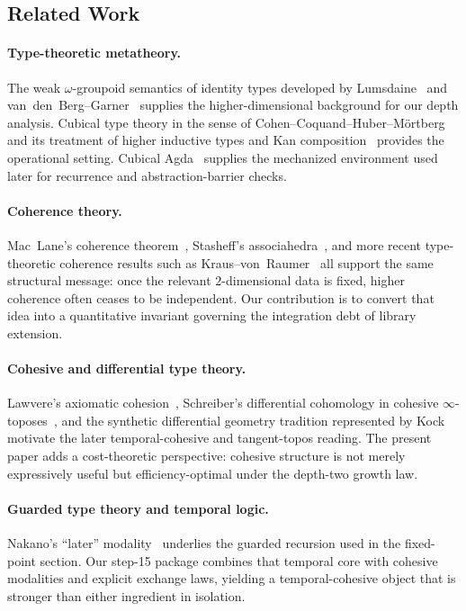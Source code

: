 \documentclass[11pt,a4paper]{article}
\theoremstyle{plain}
\theoremstyle{definition}
\theoremstyle{remark}
\begin{document}
\subsection{Related Work}
\label{sec:related}

\paragraph{Type-theoretic metatheory.}
The weak $\omega$-groupoid semantics of identity types developed by Lumsdaine~\cite{lumsdaine} and van~den~Berg--Garner~\cite{vdberg-garner} supplies the higher-dimensional background for our depth analysis.  Cubical type theory in the sense of Cohen--Coquand--Huber--M\"ortberg~\cite{cubical} and its treatment of higher inductive types and Kan composition~\cite{cchm-hits} provides the operational setting.  Cubical Agda~\cite{cubical-agda} supplies the mechanized environment used later for recurrence and abstraction-barrier checks.

\paragraph{Coherence theory.}
Mac~Lane's coherence theorem~\cite{maclane-coherence}, Stasheff's associahedra~\cite{stasheff}, and more recent type-theoretic coherence results such as Kraus--von~Raumer~\cite{kraus-vonraumer} all support the same structural message: once the relevant $2$-dimensional data is fixed, higher coherence often ceases to be independent.  Our contribution is to convert that idea into a quantitative invariant governing the integration debt of library extension.

\paragraph{Cohesive and differential type theory.}
Lawvere's axiomatic cohesion~\cite{lawvere}, Schreiber's differential cohomology in cohesive $\infty$-toposes~\cite{schreiber}, and the synthetic differential geometry tradition represented by Kock~\cite{kock} motivate the later temporal-cohesive and tangent-topos reading.  The present paper adds a cost-theoretic perspective: cohesive structure is not merely expressively useful but efficiency-optimal under the depth-two growth law.

\paragraph{Guarded type theory and temporal logic.}
Nakano's ``later'' modality~\cite{nakano} underlies the guarded recursion used in the fixed-point section.  Our step-15 package combines that temporal core with cohesive modalities and explicit exchange laws, yielding a temporal-cohesive object that is stronger than either ingredient in isolation.
\end{document}
